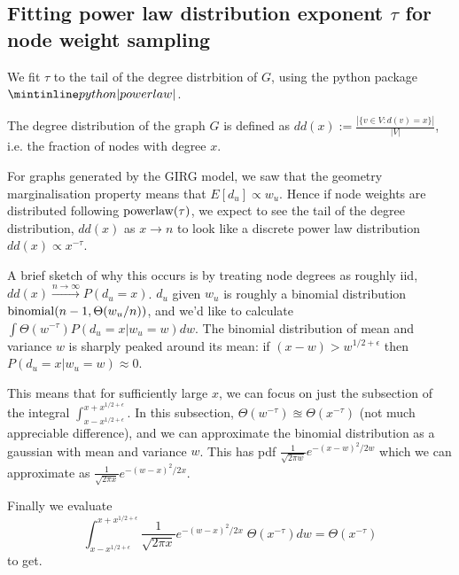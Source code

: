 \subsection{Fitting power law distribution exponent $\tau$ for node weight sampling}
We fit $\tau$ to the tail of the degree distrbition of $G$, using the python package $\PLP$.

The degree distribution of the graph $G$ is defined as $dd(x) := \frac{|\{v \in V: d(v) = x\}|}{|V|}$, i.e. the fraction of nodes with degree $x$.

For graphs generated by the GIRG model, we saw that the geometry marginalisation property means that $E[d_u] \propto w_u$. Hence if node weights are distributed following $\operatorname{powerlaw}(\tau)$, we expect to see the tail of the degree distribution, $dd(x)$ as $x \to n$ to look like a discrete power law distribution $dd(x) \propto x^{-\tau}$.

A brief sketch of why this occurs is 
by treating node degrees as roughly iid, $dd(x) \stackrel{n \to \infty}{\to} P(d_u = x)$.
$d_u$ given $w_u$ is roughly a binomial distribution $\operatorname{binomial}(n-1, \Theta(w_u / n))$, and we'd like to calculate $\int \Theta(w^{-\tau}) P(d_u = x | w_u = w) dw$.
The binomial distribution of mean and variance $w$ is sharply peaked around its mean: if $(x-w) > w^{1/2 + \epsilon}$ then $P(d_u = x | w_u = w) \approx 0$.

This means that for sufficiently large $x$, we can focus on just the subsection of the integral $\int_{x-x^{1/2 + \epsilon}}^{x + x^{1/2 + \epsilon}}$.
In this subsection, $\Theta(w^{-\tau}) \approxeq \Theta(x^{-\tau})$ (not much appreciable difference), and we can approximate the binomial distribution as a gaussian with mean and variance $w$. This has pdf $\frac{1}{\sqrt{2 \pi w}} e^{-(x-w)^2/2w}$ which we can approximate as $\frac{1}{\sqrt{2 \pi x}} e^{-(w-x)^2/2x}$.

Finally we evaluate
\begin{equation}
\int_{x-x^{1/2 + \epsilon}}^{x + x^{1/2 + \epsilon}} \frac{1}{\sqrt{2 \pi x}} e^{-(w-x)^2/2x} \; \Theta(x^{-\tau}) dw = \Theta(x^{-\tau})
\end{equation}
to get.


